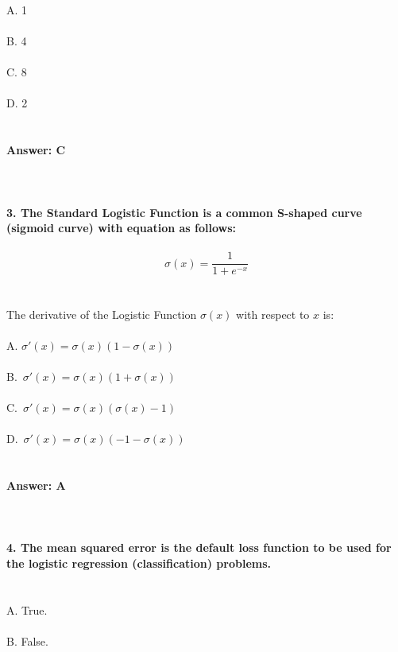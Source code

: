 \documentclass[prl,twocolumn,showpacs,preprintnumbers,superscriptaddress]{revtex4}
\theoremstyle{plain}
\theoremstyle{definition}
\begin{document}
\begin{widetext}
\\
\\
\\
\noindent A. 1 
\\
\\
B. 4
\\
\\
C. 8
\\
\\
D. 2
\\
\\
\\
\textbf{Answer: C}
\\
\\
\\
\\
\textbf{3. The Standard Logistic Function is a common S-shaped curve (sigmoid curve) with equation as follows:}
\\
\\
\begin{equation}
    \sigma(x) = \frac{1}{1 + e^{-x}} {} \nonumber
\end{equation}
\\
\\
The derivative of the Logistic Function $\sigma(x)$ with respect to $x$ is:
\\
\\
\noindent A. $\sigma'(x) = \sigma(x)(1 - \sigma(x))$
\\
\\
B.\  $\sigma'(x) = \sigma(x)(1 + \sigma(x))$
\\
\\
C.\  $\sigma'(x) = \sigma(x)(\sigma(x) - 1)$
\\
\\
D.\  $\sigma'(x) = \sigma(x)(-1 - \sigma(x))$
\\
\\
\\
\textbf{Answer: A}
\\
\\
\\
\\
\textbf{4. The mean squared error is the default loss function to be used for the logistic regression (classification) problems.}
\\
\\
\\
\noindent A. True.
\\
\\
B. False.
\\
\\

\end{widetext}
\end{document}
